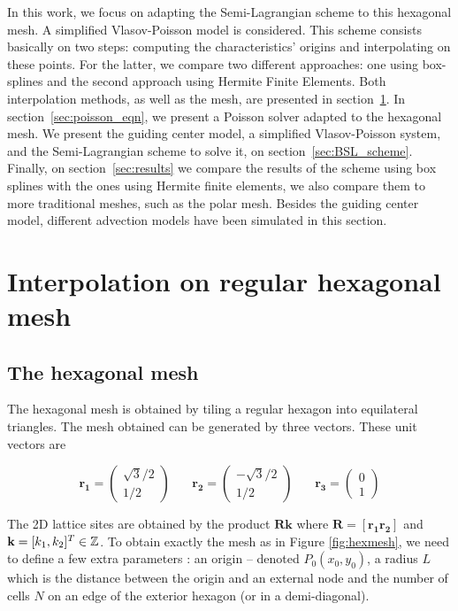 \documentclass[proc]{edpsmath}
\begin{document}
In this work, we focus on adapting the Semi-Lagrangian scheme to this hexagonal mesh. A simplified Vlasov-Poisson model is considered. This scheme consists basically on two steps: computing the characteristics' origins and interpolating on these points. For the latter, we compare two different approaches: one using box-splines and the second approach using Hermite Finite Elements. Both interpolation methods, as well as the mesh, are presented in section~\ref{sec:interpolation}. In section~\ref{sec:poisson_eqn}, we present a Poisson solver adapted to the hexagonal mesh. We present the guiding center model, a simplified Vlasov-Poisson system, and the Semi-Lagrangian scheme to solve it, on section~\ref{sec:BSL_scheme}. Finally, on section~\ref{sec:results} we compare the results of the scheme using box splines with the ones using Hermite finite elements, we also compare them to more traditional meshes, such as the polar mesh. Besides the guiding center model, different advection models have been simulated in this section.


\section{Interpolation on regular hexagonal mesh}
\label{sec:interpolation}
\subsection{The hexagonal mesh}

The hexagonal mesh is obtained by tiling a regular hexagon into equilateral triangles. The mesh obtained can be generated by three vectors. These unit vectors are

\begin{equation}
	\mathbf{r_1} = \begin{pmatrix}\sqrt{3}/2 \\  1/2
		\end{pmatrix} ~~~~~~~~
	\mathbf{r_2} = \begin{pmatrix}-\sqrt{3}/2 \\ 1/2
		\end{pmatrix} ~~~~~~~~
	\mathbf{r_3} = \begin{pmatrix} 0 \\ 1
		\end{pmatrix}
\end{equation}

The 2D lattice sites are obtained by the product $\mathbf{Rk}$ where $\mathbf{R} = [\mathbf{r_1 r_2}]$ and $\mathbf{k} = [k_1, k_2]^T \in \mathbb{Z}$.  To obtain exactly the mesh as in Figure \ref{fig:hexmesh}, we need to define a few extra parameters : an origin -- denoted $P_0(x_0, y_0)$, a radius $L$ which is the distance between the origin and an external node and the number of cells $N$ on an edge of the exterior hexagon (or in a demi-diagonal).
\end{document}
